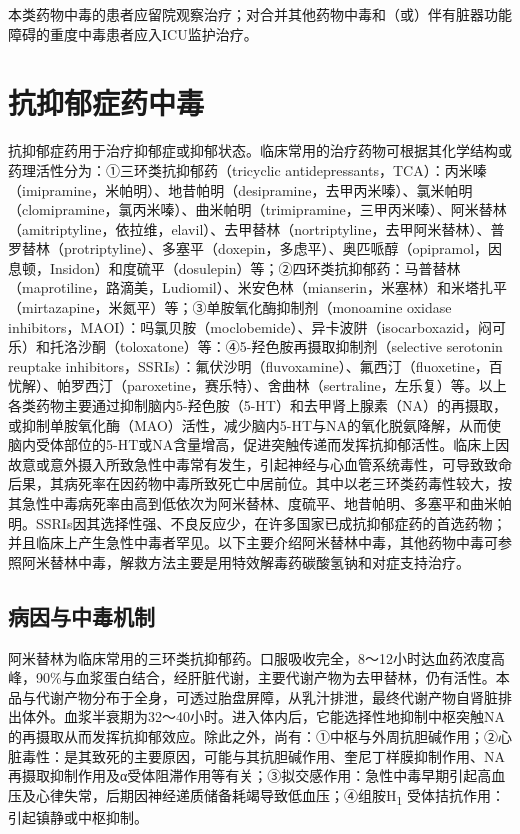 本类药物中毒的患者应留院观察治疗；对合并其他药物中毒和（或）伴有脏器功能障碍的重度中毒患者应入ICU监护治疗。

\protect\hypertarget{text00134.html}{}{}

\section{抗抑郁症药中毒}

抗抑郁症药用于治疗抑郁症或抑郁状态。临床常用的治疗药物可根据其化学结构或药理活性分为：①三环类抗抑郁药（tricyclic
antidepressants，TCA）：丙米嗪（imipramine，米帕明）、地昔帕明（desipramine，去甲丙米嗪）、氯米帕明（clomipramine，氯丙米嗪）、曲米帕明（trimipramine，三甲丙米嗪）、阿米替林（amitriptyline，依拉维，elavil）、去甲替林（nortriptyline，去甲阿米替林）、普罗替林（protriptyline）、多塞平（doxepin，多虑平）、奥匹哌醇（opipramol，因息顿，Insidon）和度硫平（dosulepin）等；②四环类抗抑郁药：马普替林（maprotiline，路滴美，Ludiomil）、米安色林（mianserin，米塞林）和米塔扎平（mirtazapine，米氮平）等；③单胺氧化酶抑制剂（monoamine
oxidase
inhibitors，MAOI）：吗氯贝胺（moclobemide）、异卡波阱（isocarboxazid，闷可乐）和托洛沙酮（toloxatone）等：④5-羟色胺再摄取抑制剂（selective
serotonin reuptake
inhibitors，SSRIs）：氟伏沙明（fluvoxamine）、氟西汀（fluoxetine，百忧解）、帕罗西汀（paroxetine，赛乐特）、舍曲林（sertraline，左乐复）等。以上各类药物主要通过抑制脑内5-羟色胺（5-HT）和去甲肾上腺素（NA）的再摄取，或抑制单胺氧化酶（MAO）活性，减少脑内5-HT与NA的氧化脱氨降解，从而使脑内受体部位的5-HT或NA含量增高，促进突触传递而发挥抗抑郁活性。临床上因故意或意外摄入所致急性中毒常有发生，引起神经与心血管系统毒性，可导致致命后果，其病死率在因药物中毒所致死亡中居前位。其中以老三环类药毒性较大，按其急性中毒病死率由高到低依次为阿米替林、度硫平、地昔帕明、多塞平和曲米帕明。SSRIs因其选择性强、不良反应少，在许多国家已成抗抑郁症药的首选药物；并且临床上产生急性中毒者罕见。以下主要介绍阿米替林中毒，其他药物中毒可参照阿米替林中毒，解救方法主要是用特效解毒药碳酸氢钠和对症支持治疗。

\subsection{病因与中毒机制}

阿米替林为临床常用的三环类抗抑郁药。口服吸收完全，8～12小时达血药浓度高峰，90\%与血浆蛋白结合，经肝脏代谢，主要代谢产物为去甲替林，仍有活性。本品与代谢产物分布于全身，可透过胎盘屏障，从乳汁排泄，最终代谢产物自肾脏排出体外。血浆半衰期为32～40小时。进入体内后，它能选择性地抑制中枢突触NA的再摄取从而发挥抗抑郁效应。除此之外，尚有：①中枢与外周抗胆碱作用；②心脏毒性：是其致死的主要原因，可能与其抗胆碱作用、奎尼丁样膜抑制作用、NA再摄取抑制作用及α受体阻滞作用等有关；③拟交感作用：急性中毒早期引起高血压及心律失常，后期因神经递质储备耗竭导致低血压；④组胺H\textsubscript{1}
受体拮抗作用：引起镇静或中枢抑制。

